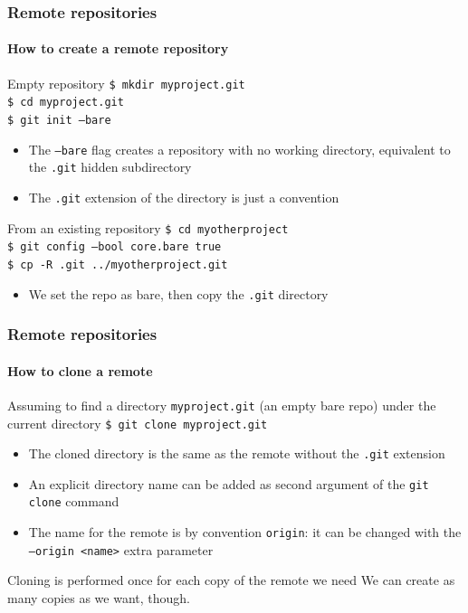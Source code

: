 \begin{frame}
\frametitle{Remote repositories}
\framesubtitle{How to create a remote repository}

\begin{block}{Empty repository}
\texttt{\$ mkdir myproject.git} \\
\texttt{\$ cd myproject.git} \\
\texttt{\$ git init ---bare}

\begin{itemize}
\item The \texttt{---bare} flag creates a repository with no working directory, equivalent to the \texttt{.git} hidden subdirectory
\item The \texttt{.git} extension of the directory is just a convention
\end{itemize}
\end{block}

\begin{block}{From an existing repository}
\texttt{\$ cd myotherproject} \\
\texttt{\$ git config ---bool core.bare true} \\
\texttt{\$ cp -R .git ../myotherproject.git}

\begin{itemize}
\item We set the repo as bare, then copy the \texttt{.git} directory
\end{itemize}
\end{block}

\end{frame}

\begin{frame}
\frametitle{Remote repositories}
\framesubtitle{How to clone a remote}

\begin{block}{Assuming to find a directory \texttt{myproject.git} (an empty bare repo) under the current directory}
\texttt{\$ git clone myproject.git} 

\begin{itemize}
\item The cloned directory is the same as the remote without the \texttt{.git} extension
\item An explicit directory name can be added as second argument of the \texttt{git clone} command
\item The name for the remote is by convention \texttt{origin}: it can be changed with the \texttt{---origin <name>} extra parameter
\end{itemize}
\end{block}

\begin{block}{Cloning is performed once for each copy of the remote we need}
We can create as many copies as we want, though.
\end{block}

\end{frame}

